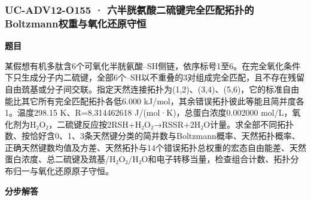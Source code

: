 \documentclass[UTF8,11pt,a4paper]{ctexart}
\begin{document}
\subsubsection*{UC-ADV12-O155 · 六半胱氨酸二硫键完全匹配拓扑的Boltzmann权重与氧化还原守恒}
\noindent\textbf{题目}\par
某假想有机多肽含6个可氧化半胱氨酸–SH侧链，依序标号1至6。在完全氧化条件下只生成分子内二硫键，全部6个–SH以不重叠的3对组成完全匹配，且不存在残留自由巯基或分子间交联。指定天然连接拓扑为(1,2)、(3,4)、(5,6)，它的标准自由能比其它所有完全匹配拓扑各低6.000 kJ/mol，其余错误拓扑彼此等能且简并度各1。温度298.15 K、R=8.314462618 J/(mol·K)，总蛋白浓度0.002000 mol/L，氧化剂为H₂O₂，二硫键反应按2RSH+H₂O₂→RSSR+2H₂O计量。求全部不同拓扑数、按恰好含0、1、3条天然键分类的简并数与Boltzmann概率、天然拓扑概率、正确天然键数均值及方差、天然拓扑与14个错误拓扑总权重的宏态自由能差、天然蛋白浓度、总二硫键及巯基/H₂O₂/H₂O和电子转移当量，检查组合计数、拓扑分布归一与氧化还原原子守恒。\par
\medskip\noindent\textbf{分步解答}
\end{document}
